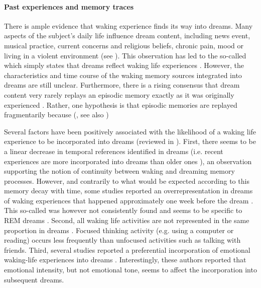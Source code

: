 \paragraph{Past experiences and memory traces}

There is ample evidence that waking experience finds its way into dreams. Many aspects of the subject’s daily life influence dream content, including news event, musical practice, current concerns and religious beliefs, chronic pain, mood or living in a violent environment (see \citealp{ruby_experimental_2011}). This observation has led to the so-called  which simply states that dreams reflect waking life experiences \citep{schredl_continuity_2003}. However, the characteristics and time course of the waking memory sources integrated into dreams are still unclear. Furthermore, there is a rising consensus that dream content very rarely replays an episodic memory exactly as it was originally experienced \citep{fosse_dreaming_2003, nielsen_what_2005}. Rather, one hypothesis is that episodic memories are replayed fragmentarily because  (\citealp{malinowski_memory_2014}, see also \citealp{schwartz_are_2003})

Several factors have been positively associated with the likelihood of a waking life experience to be incorporated into dreams (reviewed in \citealp{schredl_characteristics_2010}). First, there seems to be a linear decrease in temporal references identified in dreams (i.e. recent experiences are more incorporated into dreams than older ones \citealp{botman_dream_1990, strauch_dem_2004, grenier_temporal_2005}), an observation supporting the notion of continuity between waking and dreaming memory processes. However, and contrarily to what would be expected according to this memory decay with time, some studies reported an overrepresentation in dreams of waking experiences that happened approximately one week before the dream \citep{nielsen_day-residue_1992, marquardt_empirical_1996, blagrove_replication_2011}. This so-called  was however not consistently found and seems to be specific to REM dreams \citep{blagrove_assessing_2011, van_rijn_dream-lag_2015}. Second, all waking life activities are not represented in the same proportion in dreams \citep{hartmann_we_1996, schredl_continuity_2000}. Focused thinking activity (e.g. using a computer or reading) occurs less frequently than unfocused activities such as talking with friends. Third, several studies reported a preferential incorporation of emotional waking-life experiences into dreams \citep{malinowski_evidence_2014, schredl_factors_2006}. Interestingly, these authors reported that emotional intensity, but not emotional tone, seems to affect the incorporation into subsequent dreams.

